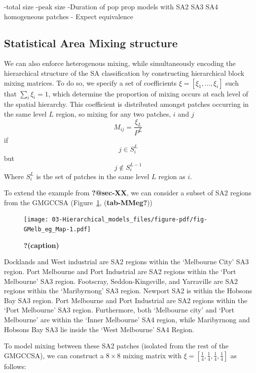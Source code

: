 \documentclass[
  letterpaper,
  DIV=11,
  numbers=noendperiod]{scrreprt}
\begin{document}
-total size -peak size -Duration of pop prop models with SA2 SA3 SA4
homogeneous patches - Expect equivalence

\hypertarget{statistical-area-mixing-structure}{%
\subsection{Statistical Area Mixing
structure}\label{statistical-area-mixing-structure}}

We can also enforce heterogenous mixing, while simultaneously encoding
the hierarchical structure of the SA classification by constructing
hierarchical block mixing matrices. To do so, we specify a set of
coefficients \(\xi = [\xi_1, ..., \xi_i]\) such that
\(\sum\limits_{i}\xi_{i}=1\), which determine the proportion of mixing
occurs at each level of the spatial hierarchy. This coefficient is
distributed amongst patches occurring in the same level \(L\) region, so
mixing for any two patches, \(i\) and \(j\) \[
M_{ij}= \frac{\xi_{L}}{P^{L}} 
\] if \[
j \in S_{i}^{L}
\] but \[j \notin S_{i}^{L-1}\] Where \(S_{i}^{L}\) is the set of
patches in the same level \(L\) region as \(i\).

To extend the example from \textbf{?@sec-XX}, we can consider a subset
of SA2 regions from the GMGCCSA (Figure~\ref{fig-GMelb_eg_Map},
(\textbf{tab-MMeg?}))

\begin{figure}

{\centering \texttt{[image: 03-Hierarchical\_models\_files/figure-pdf/fig-GMelb\_eg\_Map-1.pdf]}

}

\caption{\label{fig-GMelb_eg_Map}\textbf{?(caption)}}

\end{figure}

Docklands and West industrial are SA2 regions within the `Melbourne
City' SA3 region. Port Melbourne and Port Industrial are SA2 regions
within the `Port Melbourne' SA3 region. Footscray, Seddon-Kingsville,
and Yarraville are SA2 regions within the `Maribyrnong' SA3 region.
Newport SA2 is within the Hobsons Bay SA3 region. Port Melbourne and
Port Industrial are SA2 regions within the `Port Melbourne' SA3 region.
Furthermore, both `Melbourne city' and `Port Melbourne' are within the
`Inner Melbourne' SA4 region, while Maribyrnong and Hobsons Bay SA3 lie
inside the `West Melbourne' SA4 Region.

To model mixing between these SA2 patches (isolated from the rest of the
GMGCCSA), we can construct a \(8 \times 8\) mixing matrix with
\(\xi = \left[ \frac{1}{4}, \frac{1}{4},\frac{1}{4},\frac{1}{4} \right]\)
as follows:
\end{document}
